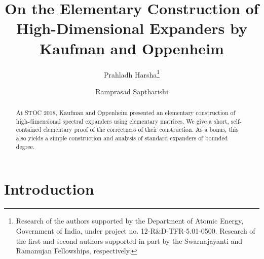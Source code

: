 \documentclass{toc}
\begin{document}
\begin{frontmatter}[classification=text] %

%
%
%

%
%
%
%
%
\title{On the Elementary Construction of
       High-Dimensional Expanders
       by Kaufman and Oppenheim}

%
%

%
%
%
%
%
%

%
%
%
%
%
%
%
%
%
%
%
%

%
%
%
%

%

%
\author[harsha]{Prahladh Harsha\thanks{Research of   %
    the authors supported by the Department of Atomic Energy,
    Government of India, under project no. 12-R\&D-TFR-5.01-0500. Research
    of the first and second authors supported in part by the Swarnajayanti
    and Ramanujan Fellowships, respectively.}} %
%
%
\author[saptharishi]{Ramprasad Saptharishi\samethanks}    %

%
%
%
%

%
%
%
%
%
%
%
%
\begin{abstract}
%
%
%
%
%
%
%
At STOC 2018, Kaufman and Oppenheim presented an elementary construction
of high-dimensional spectral expanders using elementary matrices.
We give a short, self-contained elementary proof of the correctness of
their construction.  %
As a bonus, this also yields a simple construction and analysis of standard
expanders of bounded degree.  %
%
%
\end{abstract}

%

\end{frontmatter}

\section{Introduction}
\end{document}
